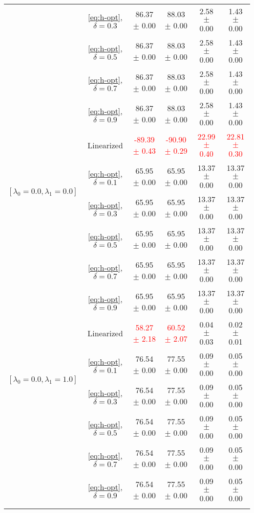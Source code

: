 \begin{table}[h]
\begin{adjustbox}{max width=1\textwidth,center}
\begin{tabular}{cccccc}
    & \ref{eq:h-opt}, $\delta=0.3$  & 86.37 $\pm$ 0.00 & 88.03 $\pm$ 0.00   & 2.58 $\pm$ 0.00 & 1.43 $\pm$ 0.00\\
    & \ref{eq:h-opt}, $\delta=0.5$  & 86.37 $\pm$ 0.00 & 88.03 $\pm$ 0.00   & 2.58 $\pm$ 0.00 & 1.43 $\pm$ 0.00  \\
    & \ref{eq:h-opt}, $\delta=0.7$  & 86.37 $\pm$ 0.00 & 88.03 $\pm$ 0.00   & 2.58 $\pm$ 0.00 & 1.43 $\pm$ 0.00\\
    & \ref{eq:h-opt}, $\delta=0.9$  & 86.37 $\pm$ 0.00 & 88.03 $\pm$ 0.00   & 2.58 $\pm$ 0.00 & 1.43 $\pm$ 0.00\\
    \midrule
    \multirow{4}{*}{$[\lambda_0=0.0, \lambda_1 = 0.0]$}
    & Linearized & \textcolor{red}{-89.39 $\pm$ 0.43} & \textcolor{red}{-90.90 $\pm$ 0.29 }  & \textcolor{red}{22.99 $\pm$ 0.40 }& \textcolor{red}{22.81 $\pm$ 0.30 }  \\ 
    & \ref{eq:h-opt}, $\delta=0.1$  & 65.95 $\pm$ 0.00 & 65.95 $\pm$ 0.00   & 13.37 $\pm$ 0.00 & 13.37 $\pm$ 0.00  \\
    & \ref{eq:h-opt}, $\delta=0.3$  & 65.95 $\pm$ 0.00 & 65.95 $\pm$ 0.00   & 13.37 $\pm$ 0.00 & 13.37 $\pm$ 0.00\\
    & \ref{eq:h-opt}, $\delta=0.5$  & 65.95 $\pm$ 0.00 & 65.95 $\pm$ 0.00   & 13.37 $\pm$ 0.00 & 13.37 $\pm$ 0.00  \\
    & \ref{eq:h-opt}, $\delta=0.7$  & 65.95 $\pm$ 0.00 & 65.95 $\pm$ 0.00   & 13.37 $\pm$ 0.00 & 13.37 $\pm$ 0.00\\
    & \ref{eq:h-opt}, $\delta=0.9$  & 65.95 $\pm$ 0.00 & 65.95 $\pm$ 0.00   & 13.37 $\pm$ 0.00 & 13.37 $\pm$ 0.00  \\
    \midrule
    \multirow{4}{*}{$[\lambda_0=0.0, \lambda_1 = 1.0]$}
    & Linearized & \textcolor{red}{58.27 $\pm$ 2.18} & \textcolor{red}{60.52 $\pm$ 2.07 }  & 0.04 $\pm$ 0.03 & 0.02 $\pm$ 0.01  \\ 
    & \ref{eq:h-opt}, $\delta=0.1$  & 76.54 $\pm$ 0.00 & 77.55 $\pm$ 0.00   & 0.09 $\pm$ 0.00 & 0.05 $\pm$ 0.00\\
    & \ref{eq:h-opt}, $\delta=0.3$  & 76.54 $\pm$ 0.00 & 77.55 $\pm$ 0.00   & 0.09 $\pm$ 0.00 & 0.05 $\pm$ 0.00\\
    & \ref{eq:h-opt}, $\delta=0.5$  & 76.54 $\pm$ 0.00 & 77.55 $\pm$ 0.00   & 0.09 $\pm$ 0.00 & 0.05 $\pm$ 0.00\\
    & \ref{eq:h-opt}, $\delta=0.7$  & 76.54 $\pm$ 0.00 & 77.55 $\pm$ 0.00   & 0.09 $\pm$ 0.00 & 0.05 $\pm$ 0.00\\
    & \ref{eq:h-opt}, $\delta=0.9$  & 76.54 $\pm$ 0.00 & 77.55 $\pm$ 0.00   & 0.09 $\pm$ 0.00 & 0.05 $\pm$ 0.00\\
    \bottomrule
    \addtocounter{table}{-1} %
    \end{tabular}
    \end{adjustbox}
\end{table}

